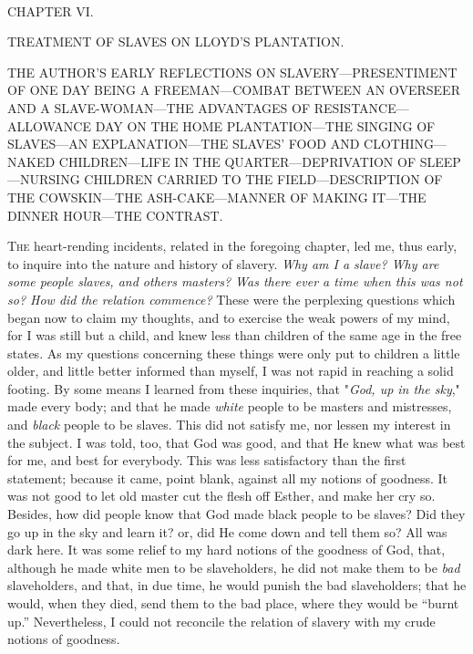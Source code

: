 {}

~

{CHAPTER VI.}

TREATMENT OF SLAVES ON LLOYD'S PLANTATION.

{THE AUTHOR'S EARLY REFLECTIONS ON SLAVERY---PRESENTIMENT OF ONE DAY
BEING A FREEMAN---COMBAT BETWEEN AN OVERSEER AND A SLAVE-WOMAN---THE
ADVANTAGES OF RESISTANCE---ALLOWANCE DAY ON THE HOME PLANTATION---THE
SINGING OF SLAVES---AN EXPLANATION---THE SLAVES' FOOD AND
CLOTHING---NAKED CHILDREN---LIFE IN THE QUARTER---DEPRIVATION OF
SLEEP---NURSING CHILDREN CARRIED TO THE FIELD---DESCRIPTION OF THE
COWSKIN---THE ASH-CAKE---MANNER OF MAKING IT---THE DINNER HOUR---THE
CONTRAST.}

\textsc{The} heart-rending incidents, related in the foregoing chapter,
led me, thus early, to inquire into the nature and history of slavery.
\emph{Why am I a slave? Why are some people slaves, and others masters?
Was there ever a time when this was not so? How did the relation
commence?} These were the perplexing questions which began now to claim
my thoughts, and to exercise the weak powers of my mind, for I was still
but a child, and knew less than children of the same age in the free
states. As my questions concerning these things were only put to
children a little older, and little better informed than myself, I was
not rapid in reaching a solid footing. By some means I learned from
these inquiries, that "\emph{God, up in the sky}," made every body; and
that he made \emph{white} people to be masters and mistresses, and
\emph{black} people to be slaves. This did not satisfy me, nor lessen my
interest in the subject. I was told, too, {}that God was good, and that
He knew what was best for me, and best for everybody. This was less
satisfactory than the first statement; because it came, point blank,
against all my notions of goodness. It was not good to let old master
cut the flesh off Esther, and make her cry so. Besides, how did people
know that God made black people to be slaves? Did they go up in the sky
and learn it? or, did He come down and tell them so? All was dark here.
It was some relief to my hard notions of the goodness of God, that,
although he made white men to be slaveholders, he did not make them to
be \emph{bad} slaveholders, and that, in due time, he would punish the
bad slaveholders; that he would, when they died, send them to the bad
place, where they would be ``burnt up.'' Nevertheless, I could not
reconcile the relation of slavery with my crude notions of goodness.

